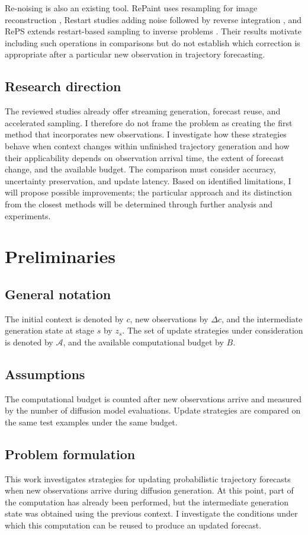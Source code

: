 \documentclass{article}
\begin{document}
Re-noising is also an existing tool. RePaint uses resampling for image reconstruction \citep{p27}, Restart studies adding noise followed by reverse integration \citep{p25}, and RePS extends restart-based sampling to inverse problems \citep{p26}. Their results motivate including such operations in comparisons but do not establish which correction is appropriate after a particular new observation in trajectory forecasting.

\subsection{Research direction}

The reviewed studies already offer streaming generation, forecast reuse, and accelerated sampling. I therefore do not frame the problem as creating the first method that incorporates new observations. I investigate how these strategies behave when context changes within unfinished trajectory generation and how their applicability depends on observation arrival time, the extent of forecast change, and the available budget. The comparison must consider accuracy, uncertainty preservation, and update latency. Based on identified limitations, I will propose possible improvements; the particular approach and its distinction from the closest methods will be determined through further analysis and experiments.

\clearpage
\section{Preliminaries}\label{sec:prelim}
\subsection{General notation}
The initial context is denoted by $c$, new observations by $\Delta c$, and the intermediate generation state at stage $s$ by $z_s$. The set of update strategies under consideration is denoted by $\mathcal A$, and the available computational budget by $B$.

\subsection{Assumptions}
The computational budget is counted after new observations arrive and measured by the number of diffusion model evaluations. Update strategies are compared on the same test examples under the same budget.

\subsection{Problem formulation}\label{sec:problem}
This work investigates strategies for updating probabilistic trajectory forecasts when new observations arrive during diffusion generation. At this point, part of the computation has already been performed, but the intermediate generation state was obtained using the previous context. I investigate the conditions under which this computation can be reused to produce an updated forecast.
\end{document}
